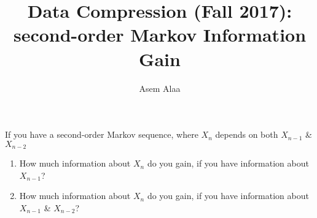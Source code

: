 \documentclass[a4paper,11pt]{book}
\begin{document}
\author{Asem Alaa}

\title{Data Compression (Fall 2017):\\ second-order Markov Information Gain}

\maketitle

\begin{question}
If you have a second-order Markov sequence, where $X_n$ depends on both $X_{n-1}$ \& $X_{n-2}$
\begin{enumerate}
\item How much information about $X_n$ do you gain, if you have information about $X_{n-1}$?
\item How much information about $X_n$ do you gain, if you have information about $X_{n-1}$ \& $X_{n-2}$?
\end{enumerate}
\end{question}
\end{document}
